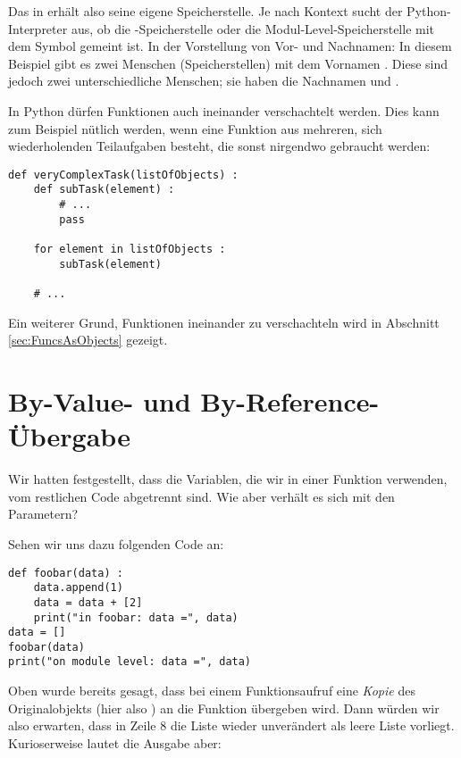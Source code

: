 Das  in  erhält also seine eigene Speicherstelle. Je nach Kontext sucht der Python-Interpreter aus, ob die -Speicherstelle oder die Modul-Level-Speicherstelle mit dem Symbol  gemeint ist. In der Vorstellung von Vor- und Nachnamen: In diesem Beispiel gibt es zwei Menschen (Speicherstellen) mit dem Vornamen . Diese sind jedoch zwei unterschiedliche Menschen; sie haben die Nachnamen  und .

In Python dürfen Funktionen auch ineinander verschachtelt werden. Dies kann zum Beispiel nütlich werden, wenn eine Funktion aus mehreren, sich wiederholenden Teilaufgaben besteht, die sonst nirgendwo gebraucht werden:

\begin{codebox}
\begin{verbatim}
def veryComplexTask(listOfObjects) :
    def subTask(element) :
        # ...
        pass
    
    for element in listOfObjects :
        subTask(element)
  
    # ...
\end{verbatim}
\end{codebox}

Ein weiterer Grund, Funktionen ineinander zu verschachteln wird in Abschnitt \ref{sec:FuncsAsObjects} gezeigt.

\section{By-Value- und By-Reference-Übergabe}
Wir hatten festgestellt, dass die Variablen, die wir in einer Funktion verwenden, vom restlichen Code abgetrennt sind. Wie aber verhält es sich mit den Parametern?

Sehen wir uns dazu folgenden Code an:
\begin{codebox}
\begin{verbatim}
def foobar(data) :
    data.append(1)
    data = data + [2]
    print("in foobar: data =", data)
data = []
foobar(data)
print("on module level: data =", data)
\end{verbatim}
\end{codebox}
Oben wurde bereits gesagt, dass bei einem Funktionsaufruf eine \emph{Kopie} des Originalobjekts (hier also ) an die Funktion übergeben wird. Dann würden wir also erwarten, dass in Zeile 8 die Liste  wieder unverändert als leere Liste vorliegt. Kurioserweise lautet die Ausgabe aber:

